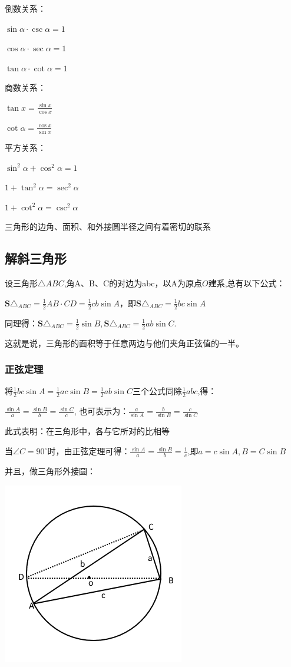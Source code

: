 \documentclass[UTF8]{ctexbook}
\newcommand{\degree}{^\circ}
\begin{document}
{{{  倒数关系：

  $\sin\alpha \cdot \csc\alpha = 1$

  $\cos\alpha \cdot \sec\alpha = 1$

  $\tan\alpha \cdot \cot\alpha = 1$

  商数关系：

  $\tan{x} = \frac{\sin{x}}{\cos{x}}$

  $\cot\alpha = \frac{\cos x}{\sin x}$

  平方关系：

  $\sin^2\alpha + \cos^2\alpha = 1$

  $1 + \tan^2\alpha = \sec^2\alpha$

  $1 + \cot^2\alpha = \csc^2\alpha$

}%

三角形的边角、面积、和外接圆半径之间有着密切的联系

\subsection{解斜三角形}{
设三角形$\triangle ABC$,角A、B、C的对边为abc，以A为原点$O$建系,总有以下公式：

$\mathbf{S}\triangle_{ABC} = \frac{1}{2}AB \cdot CD = \frac{1}{2}cb\sin A$，即$\mathbf{S}\triangle_{ABC} = \frac{1}{2}bc\sin A$

同理得：$\mathbf{S}\triangle_{ABC} = \frac{1}{2}\sin B, \mathbf{S}\triangle_{ABC} = \frac{1}{2}ab\sin C$.

这就是说，三角形的面积等于任意两边与他们夹角正弦值的一半。

\subsubsection{正弦定理}
将$\frac{1}{2}bc\sin A = \frac{1}{2}ac\sin B = \frac{1}{2}ab\sin C$三个公式同除$\frac{1}{2}abc$,得：

$\frac{\sin A}{a} = \frac{\sin B}{b} = \frac{\sin C}{c}$, 也可表示为：$\frac{a}{\sin A} = \frac{b}{\sin B} = \frac{c}{\sin C}$

此式表明：在三角形中，各{}与它所对{}的比相等

当$\angle C = 90\degree$时，由正弦定理可得：$\frac{\sin A}{a} = \frac{\sin B}{b} = \frac{1}{c}$,即$a = c\sin A,B = C\sin B$

并且，做三角形外接圆：

\includegraphics[scale=0.5]{resources/insideTriangleAndCircleOutSide.png}

}}}
\end{document}
